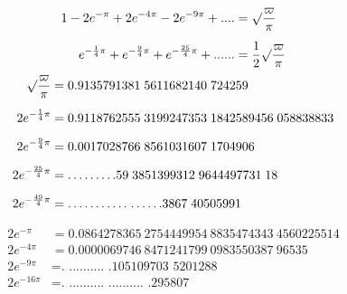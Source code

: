 \[
\begin{aligned}
1-2e^{-\pi}+2e^{-4\pi}-2e^{-9\pi}+\mathord{.}\mathord{.}\mathord{.}\mathord{.}
&=\surd\dfrac{\varpi}{\pi}\\[5pt]
e^{-\frac14\pi}+e^{-\frac94\pi}+e^{-\frac{25}{4}\pi}+\mathord{.}\mathord{.}\mathord{.}\mathord{.}\mathord{.}\mathord{.}
&=\dfrac12\surd\dfrac{\varpi}{\pi}
\end{aligned}
\]
\[
\begin{aligned}
\surd\dfrac{\varpi}{\pi}&=0.9135791381\;5611682140\;724259\\[5pt]
2e^{-\frac14\pi}&=0.9118762555\;3199247353\;1842589456\;058838833\\[5pt]
2e^{-\frac94\pi}&=0.0017028766\;8561031607\;1704906\\[5pt]
2e^{-\frac{25}{4}\pi}&=.\,.\,.\,.\,.\,.\,.\,.\,.59\;3851399312\;9644497731\;18\\[5pt]
2e^{-\frac{49}{4}\pi}&=.\,.\,.\,.\,.\,.\,.\,.\,.\,.\,.\;.\,.\,.\,.\,.\,.3867\;40505991
\end{aligned}
\]



\[
\begin{aligned}
2e^{-\pi}&=0.0864278365\ 2754449954\ 8835474343\ 4560225514\\[5pt]
2e^{-4\pi}&=0.0000069746\ 8471241799\ 0983550387\ 96535\\[5pt]
2e^{-9\pi}&=\text{. .......... .105109703 5201288}\\[5pt]
2e^{-16\pi}&=\text{. .......... .......... .295807}
\end{aligned}
\]
\clearpage
\endgroup
